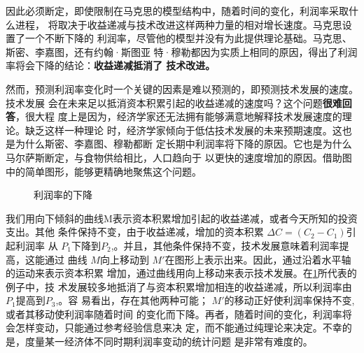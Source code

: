 因此必须断定，即使限制在马克思的模型结构中，随着时间的变化，利润率采取什么进程，
将取决于收益递减与技术改进这样两种力量的相对增长速度。马克思设置了一个不断下降的
利润率，尽管他的模型并没有为此提供理论基础。马克思、斯密、李嘉图，还有约翰·斯图亚
特·穆勒都因为实质上相同的原因，得出了利润率将会下降的结论：\textbf{收益递减抵消了
  技术改进。}

然而，预测利润率变化时一个关键的因素是难以预测的，即预测技术发展的速度。技术发展
会在未来足以抵消资本积累引起的收益递减的速度吗？这个问题\textbf{很难回答}，很大程
度上是因为，经济学家还无法拥有能够满意地解释技术发展速度的理论。缺乏这样一种理论
时，经济学家倾向于低估技术发展的未来预期速度。这也是为什么斯密、李嘉图、穆勒都断
定长期中利润率将下降的原因。它也是为什么马尔萨斯断定，与食物供给相比，人口趋向于
以更快的速度增加的原因。借助图中的简单图形，能够更精确地聚焦这个问题。

\begin{figure}[ht]
  \centering
{}%
\caption{\label{fig：marxlirun}利润率的下降 }
\end{figure}

我们用向下倾斜的曲线M表示资本积累增加引起的收益递减，或者今天所知的投资支出。其他
条件保持不变，由于收益递减，增加的资本积累 $\Delta C=(C_2 - C_1)$引起利润率
从 $P_1$下降到$P_2$,。并且，其他条件保持不变，技术发展意味着利润率提高，这能通过
曲线 $M$向上移动到 $M'$在图形上表示出来。因此，通过沿着水平轴的运动来表示资本积累
增加，通过曲线用向上移动来表示技术发展。在\cref{fig：marxlirun}所代表的例子中，技
术发展较多地抵消了与资本积累增加相连的收益递减，所以利润率由$P_1$提高到$P_3$,。容
易看出，存在其他两种可能； $M'$的移动正好使利润率保持不变,或者其移动使利润率随着时间
的变化而下降。再者，随着时间的变化，利润率将会怎样变动，只能通过参考经验信息来决
定，而不能通过纯理论来决定。不幸的是，度量某一经济体不同时期利润率变动的统计问题
是非常有难度的。

